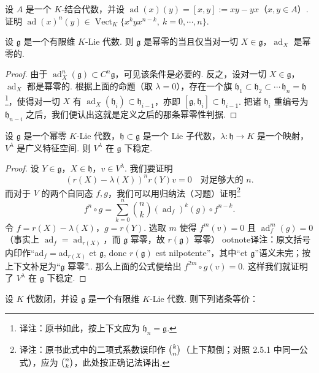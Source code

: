 \begin{numpara}[表示论刻画]
\begin{exercise*}
设 $A$ 是一个 $K$-结合代数，并设 $\operatorname{ad}(x)(y)=[x,y]:=xy-yx$（$x,y\in A$）. 证明 $\operatorname{ad}(x)^{n}(y)\in\operatorname{Vect}_{K}\{x^{k}yx^{n-k},\ k=0,\cdots,n\}$.
\end{exercise*}
\begin{corollary*}
设 $\mathfrak g$ 是一个有限维 $K$-Lie 代数. 则 $\mathfrak g$ 是幂零的当且仅当对一切 $X\in\mathfrak g$，$\operatorname{ad}_{X}$ 是幂零的.
\end{corollary*}
\begin{proof}
由于 $\operatorname{ad}_{X}^{n}(\mathfrak g)\subset C^{n}\mathfrak g$，可见该条件是必要的. 反之，设对一切 $X\in\mathfrak g$，$\operatorname{ad}_{X}$ 都是幂零的. 根据上面的命题（取 $\lambda=0$），存在一个旗 $\mathfrak h_{1}\subset\mathfrak h_{2}\subset\cdots\,\mathfrak h_{n}=\mathfrak h$\footnote{译注：原书如此，按上下文应为 $\mathfrak h_{n}=\mathfrak g$.}，使得对一切 $X$ 有 $\operatorname{ad}_{X}(\mathfrak h_{i})\subset\mathfrak h_{i-1}$，亦即 $[\mathfrak g,\mathfrak h_{i}]\subset\mathfrak h_{i-1}$. 把诸 $\mathfrak h_{i}$ 重编号为 $\mathfrak h_{n-i}$ 之后，我们便认出这就是定义之后的那条幂零性判据.
\end{proof}
\begin{lemma*}
设 $\mathfrak g$ 是一个幂零 $K$-Lie 代数，$\mathfrak h\subset\mathfrak g$ 是一个 Lie 子代数，$\lambda:\mathfrak h\longrightarrow K$ 是一个映射，$V^{\lambda}$ 是广义特征空间. 则 $V^{\lambda}$ 在 $\mathfrak g$ 下稳定.
\end{lemma*}
\begin{proof}
设 $Y\in\mathfrak g$，$X\in\mathfrak h$，$v\in V^{\lambda}$. 我们要证明
\[
(r(X)-\lambda(X))^{n}r(Y)v=0\quad\text{对足够大的 }n.
\]
而对于 $V$ 的两个自同态 $f,g$，我们可以用归纳法（习题）证明\footnote{译注：原书此式中的二项式系数误印作 $\tbinom{k}{n}$（上下颠倒；对照 2.5.1 中同一公式），应为 $\tbinom{n}{k}$，此处按正确记法译出.}
\[
f^{n}\circ g=\sum_{k=0}^{n}\binom{n}{k}(\operatorname{ad}_{f})^{k}(g)\circ f^{n-k}.
\]
令 $f=r(X)-\lambda(X)$，$g=r(Y)$. 选取 $m$ 使得 $f^{m}(v)=0$ 且 $\operatorname{ad}_{f}^{m}(g)=0$（事实上 $\operatorname{ad}_{f}=\operatorname{ad}_{r(X)}$，而 $\mathfrak g$ 幂零，故 $r(\mathfrak g)$ 幂零）ootnote{译注：原文括号内印作``ad$_f=$ad$_{r(X)}$ et $\mathfrak g$, donc $r(\mathfrak g)$ est nilpotente''，其中``et $\mathfrak g$''语义未完；按上下文补足为``$\mathfrak g$ 幂零''.}. 那么上面的公式便给出 $f^{2m}\circ g(v)=0$. 这样我们就证明了 $V^{\lambda}$ 在 $\mathfrak g$ 下稳定.
\end{proof}
\begin{theorem*}
设 $K$ 代数闭，并设 $\mathfrak g$ 是一个有限维 $K$-Lie 代数. 则下列诸条等价：

\end{theorem*}
\end{numpara}
